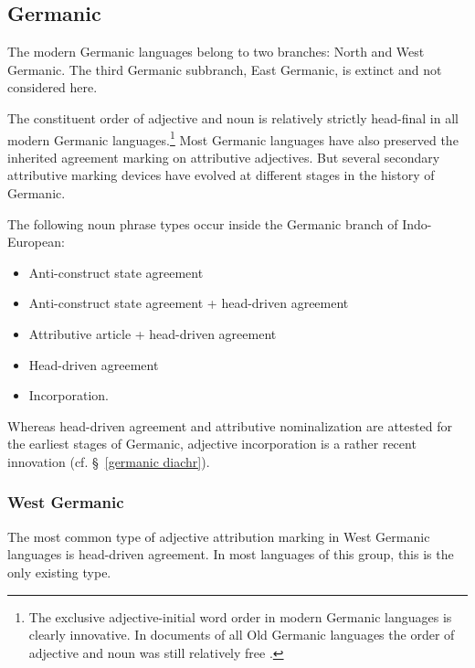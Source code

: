 \subsection{Germanic}
The modern Germanic languages belong to two branches: North and West Germanic. The third Germanic subbranch, East Germanic, is extinct and not considered here.

The constituent order of adjective and noun is relatively strictly head-final in all modern Germanic languages.\footnote{The exclusive adjective-initial word order in modern Germanic languages is clearly innovative. In documents of all Old Germanic languages the order of adjective and noun was still relatively free \citep[cf.][]{heinrichs1954}.} Most Germanic languages have also preserved the inherited agreement marking on attributive adjectives. But several secondary attributive marking devices have evolved at different stages in the history of Germanic.

The following noun phrase types occur inside the Germanic branch of Indo-European:
\begin{itemize}
\item{Anti-construct state agreement}
\item{Anti-construct state agreement + head-driven agreement}
\item{Attributive article + head-driven agreement}
\item{Head-driven agreement}
\item{Incorporation.}
\end{itemize}
Whereas head-driven agreement and attributive nominalization are attested for the earliest stages of Germanic, adjective incorporation is a rather recent innovation (cf. \S~\ref{germanic diachr}).

\subsubsection{West Germanic}\label{w-germanic synchr}
The most common type of adjective attribution marking in West Germanic languages is head-driven agreement. In most languages of this group, this is the only existing type.


